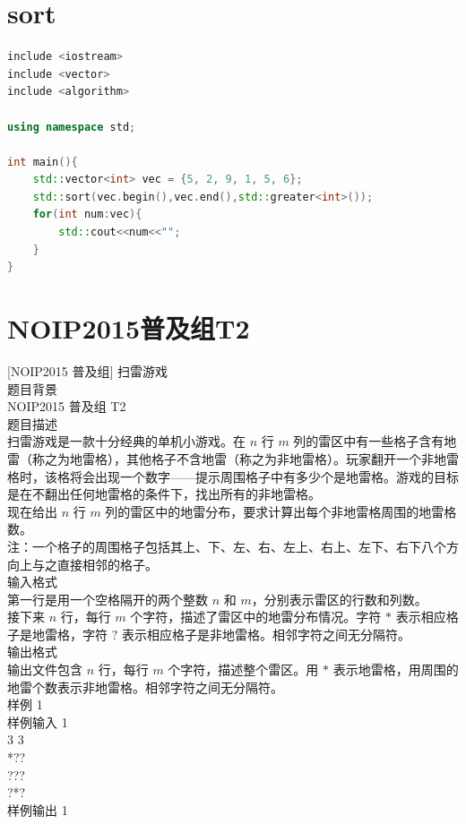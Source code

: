 \documentclass[12pt,twiside,a4paper]{ctexbook}
\numberwithin{chapter}{part}
\begin{document}
\section{sort}
\begin{lstlisting}[language=c++]
include <iostream>
include <vector>
include <algorithm>

using namespace std;

int main(){
    std::vector<int> vec = {5, 2, 9, 1, 5, 6};
    std::sort(vec.begin(),vec.end(),std::greater<int>());
    for(int num:vec){
	    std::cout<<num<<"";
    }
}
\end{lstlisting}

\section{NOIP2015普及组T2}
[NOIP2015 普及组] 扫雷游戏\\
题目背景\\
NOIP2015 普及组 T2\\
题目描述\\
扫雷游戏是一款十分经典的单机小游戏。在 $n$ 行 $m$ 列的雷区中有一些格子含有地雷（称之为地雷格），其他格子不含地雷（称之为非地雷格）。玩家翻开一个非地雷格时，该格将会出现一个数字——提示周围格子中有多少个是地雷格。游戏的目标是在不翻出任何地雷格的条件下，找出所有的非地雷格。\\
现在给出 $n$ 行 $m$ 列的雷区中的地雷分布，要求计算出每个非地雷格周围的地雷格数。\\
注：一个格子的周围格子包括其上、下、左、右、左上、右上、左下、右下八个方向上与之直接相邻的格子。\\
输入格式\\
第一行是用一个空格隔开的两个整数 $n$ 和 $m$，分别表示雷区的行数和列数。\\
接下来 $n$ 行，每行 $m$ 个字符，描述了雷区中的地雷分布情况。字符 $\texttt{*}$ 表示相应格子是地雷格，字符 $\texttt{?}$ 表示相应格子是非地雷格。相邻字符之间无分隔符。\\
输出格式\\
输出文件包含 $n$ 行，每行 $m$ 个字符，描述整个雷区。用 $\texttt{*}$ 表示地雷格，用周围的地雷个数表示非地雷格。相邻字符之间无分隔符。\\
样例 1\\
样例输入 1\\
3 3\\
*??\\
???\\
?*?\\
 样例输出 1\\
\end{document}

